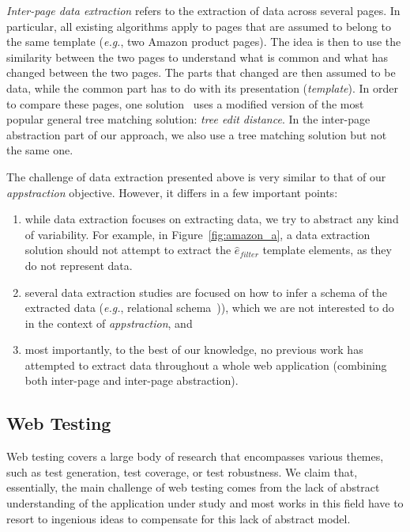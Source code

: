 \emph{Inter-page data extraction} refers to the extraction of data across several pages.
In particular, all existing algorithms apply to pages that are assumed to belong to the same template (\emph{e.g.}, two Amazon product pages).
The idea is then to use the similarity between the two pages to understand what is common and what has changed between the two pages.
The parts that changed are then assumed to be data, while the common part has to do with its presentation (\emph{template}).
In order to compare these pages, one solution~\cite{DeReis2004AutomaticDistance} uses a modified version of the most popular general tree matching solution: \emph{tree edit distance}.
In the inter-page abstraction part of our approach, we also use a tree matching solution but not the same one.

The challenge of data extraction presented above is very similar to that of our \emph{appstraction} objective. However, it differs in a few important points:
\begin{enumerate}
    \item while data extraction focuses on extracting data, we try to abstract any kind of variability.
    For example, in Figure~\ref{fig:amazon_a}, a data extraction solution should not attempt to extract the $\hat{e}_{filter}$ template elements, as they do not represent data.
    \item several data extraction studies are focused on how to infer a schema of the extracted data (\emph{e.g.}, relational schema~\cite{ArasuExtractingPages,NestorovExtractingData})), which we are not interested to do in the context of \emph{appstraction}, and
    \item most importantly, to the best of our knowledge, no previous work has attempted to extract data throughout a whole web application (combining both inter-page and inter-page abstraction).
\end{enumerate}

\subsection{Web Testing}
Web testing covers a large body of research that encompasses various themes, such as test generation, test coverage, or test robustness.
We claim that, essentially, the main challenge of web testing comes from the lack of abstract understanding of the application under study and most works in this field have to resort to ingenious ideas to compensate for this lack of abstract model.

